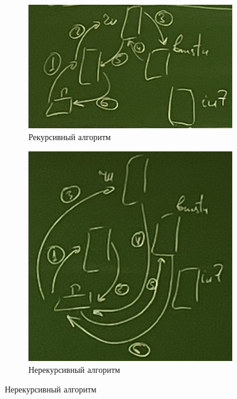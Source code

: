 \begin{figure}[H]
    \centering
    \begin{subfigure}{0.45\textwidth}
        \includegraphics[width=\textwidth]{12/notes/inc/recursive-dns}
        \caption{Рекурсивный алгоритм}
    \end{subfigure}
    \hspace{.5cm}
    \begin{subfigure}{0.45\textwidth}
        \includegraphics[width=\textwidth]{12/notes/inc/non-recursive-dns}
        \caption{Нерекурсивный алгоритм}
    \end{subfigure}
\end{figure}

